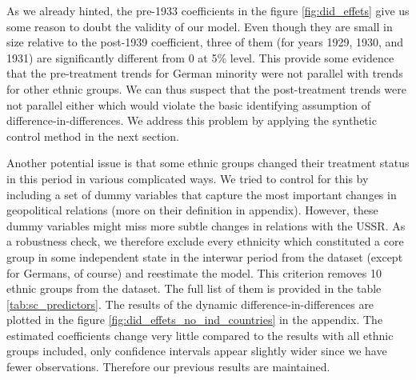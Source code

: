  
 
 
As we already hinted, the pre-1933 coefficients in the figure \ref{fig:did_effets} give us some reason to doubt the
validity of our model. Even though they are small in size relative to the post-1939 coefficient,  three of them (for years 1929, 1930, and 1931) are significantly different from 0 at 5\% level.
This provide some evidence that the pre-treatment trends for German minority were not parallel with trends for other ethnic groups. We can thus suspect that the post-treatment trends were not parallel either which
would violate the basic identifying assumption of
difference-in-differences.
We address this problem by applying the synthetic control method in the next section. 
 
Another potential issue is that some ethnic groups changed their treatment status in this period in various complicated ways. 
We tried to control for this by including a set of dummy variables  that capture the most important changes in geopolitical relations (more on their definition in appendix). 
However, these dummy variables might miss  more subtle changes in relations with the USSR. As a robustness check, we therefore exclude every ethnicity which constituted a core group in some independent state in the interwar period from the dataset (except for Germans, of course) and reestimate the model. This criterion removes 10 ethnic groups from the dataset. The full list of them is provided in the table \ref{tab:sc_predictors}. The results of the dynamic difference-in-differences are plotted in the figure \ref{fig:did_effets_no_ind_countries} in the appendix. The estimated coefficients change  very little compared to the results with all ethnic groups included, only confidence intervals appear slightly wider since we have fewer observations. Therefore our previous results are maintained. 

